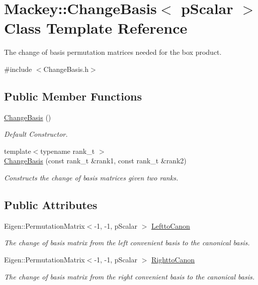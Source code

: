 \hypertarget{classMackey_1_1ChangeBasis}{}\section{Mackey\+:\+:Change\+Basis$<$ p\+Scalar $>$ Class Template Reference}
\label{classMackey_1_1ChangeBasis}


The change of basis permutation matrices needed for the box product.  




{\ttfamily \#include $<$Change\+Basis.\+h$>$}

\subsection*{Public Member Functions}
\begin{DoxyCompactItemize}
\item 
\hyperlink{classMackey_1_1ChangeBasis_a1200b696d4b6db9ad942ee583c320a50}{Change\+Basis} ()
\begin{DoxyCompactList}\small\item\em Default Constructor. \end{DoxyCompactList}\item 
{\footnotesize template$<$typename rank\+\_\+t $>$ }\\\hyperlink{classMackey_1_1ChangeBasis_a8cc49fe5537e7038ff7d142ba76e7c7b}{Change\+Basis} (const rank\+\_\+t \&rank1, const rank\+\_\+t \&rank2)
\begin{DoxyCompactList}\small\item\em Constructs the change of basis matrices given two ranks. \end{DoxyCompactList}\end{DoxyCompactItemize}
\subsection*{Public Attributes}
\begin{DoxyCompactItemize}
\item 
Eigen\+::\+Permutation\+Matrix$<$-\/1, -\/1, p\+Scalar $>$ \hyperlink{classMackey_1_1ChangeBasis_a784f69cb8de92e84fef755461c60d3d0}{Leftto\+Canon}
\begin{DoxyCompactList}\small\item\em The change of basis matrix from the left convenient basis to the canonical basis. \end{DoxyCompactList}\item 
Eigen\+::\+Permutation\+Matrix$<$-\/1, -\/1, p\+Scalar $>$ \hyperlink{classMackey_1_1ChangeBasis_aa169c2e7937437ea2102de1c3072194c}{Rightto\+Canon}
\begin{DoxyCompactList}\small\item\em The change of basis matrix from the right convenient basis to the canonical basis. \end{DoxyCompactList}\end{DoxyCompactItemize}


